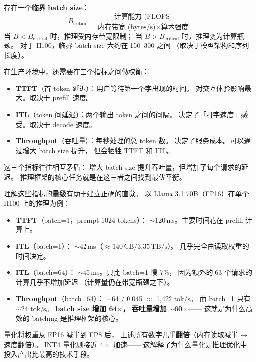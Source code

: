 存在一个\textbf{临界 batch size}：
\begin{equation}
  B_{\text{critical}} = \frac{\text{计算能力 (FLOPS)}}{\text{内存带宽 (bytes/s)} \times \text{算术强度}}
\end{equation}
当 $B < B_{\text{critical}}$ 时，推理受内存带宽限制；
当 $B > B_{\text{critical}}$ 时，推理变为计算瓶颈。
对于 H100，临界 batch size 大约在 150--300 之间
（取决于模型架构和序列长度）。

在生产环境中，还需要在三个指标之间做权衡：
\begin{itemize}[noitemsep]
  \item \textbf{TTFT}（首 token 延迟）：用户等待第一个字出现的时间。
        对交互体验影响最大。取决于 prefill 速度。
  \item \textbf{ITL}（token 间延迟）：两个输出 token 之间的间隔。
        决定了「打字速度」感受。取决于 decode 速度。
  \item \textbf{Throughput}（吞吐量）：每秒处理的总 token 数。
        决定了服务成本。可以通过增大 batch size 提升，
        但会牺牲 TTFT 和 ITL。
\end{itemize}

这三个指标往往相互矛盾：
增大 batch size 提升吞吐量，但增加了每个请求的延迟。
推理框架的核心任务就是在这三者之间找到最优平衡。

理解这些指标的\textbf{量级}有助于建立正确的直觉。
以 Llama 3.1 70B（FP16）在单个 H100 上的推理为例：
\begin{itemize}[noitemsep]
  \item \textbf{TTFT}（batch=1，prompt 1024 tokens）：
        $\sim$120\,ms。主要时间花在 prefill 计算上。
  \item \textbf{ITL}（batch=1）：
        $\sim$42\,ms（$\approx 140\,\text{GB} / 3.35\,\text{TB/s}$）。
        几乎完全由读取权重的时间决定。
  \item \textbf{ITL}（batch=64）：
        $\sim$45\,ms。只比 batch=1 慢 7\%，
        因为额外的 63 个请求的计算几乎不增加延迟
        （计算量仍在带宽瓶颈之下）。
  \item \textbf{Throughput}（batch=64）：
        $\sim$64 / 0.045 $\approx$ 1,422 tok/s。
        而 batch=1 只有 $\sim$24 tok/s。
        \textbf{batch size 增加 64$\times$，
        吞吐量增加 $\sim$60$\times$}——
        这就是为什么高效的 batching 是推理框架的核心。
\end{itemize}

量化将权重从 FP16 减半到 FP8 后，
上述所有数字几乎\textbf{翻倍}（内存读取减半 → 速度翻倍）。
INT4 量化则接近 $4\times$ 加速——
这解释了为什么量化是推理优化中
投入产出比最高的技术手段。

